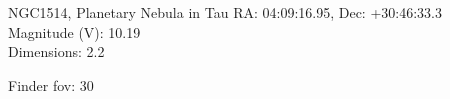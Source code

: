 \begin{block}{NGC1514, Planetary Nebula in Tau}
    RA: 04:09:16.95, Dec: +30:46:33.3 \\ 
    Magnitude (V): 10.19 \\ 
    Dimensions: 2.2 

    Finder fov: 30 
\end{block}